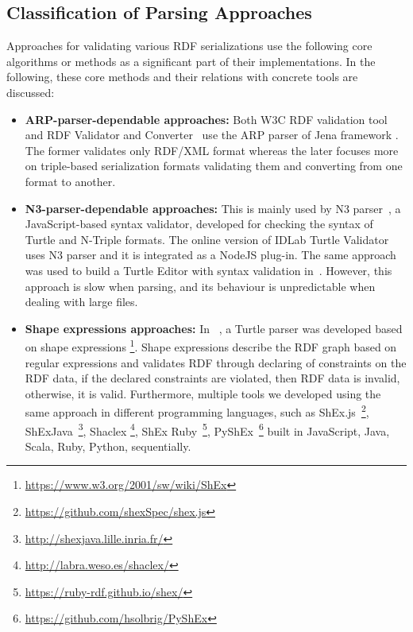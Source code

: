 \subsection{Classification of Parsing Approaches}

Approaches for validating various RDF serializations use the following core algorithms or methods as a significant part of their implementations. 
In the following, these core methods and their relations with concrete tools are discussed: 

\begin{itemize}[noitemsep] 

\item \textbf{ARP-parser-dependable approaches:} Both W3C RDF validation tool~\cite{W3C:Validation:Online} and RDF Validator and Converter~\cite{Mybluemix:Validation:Online} use the ARP parser of Jena framework \cite{McBride:2002:JSW:613357.613755}. 
The former validates only RDF/XML format whereas the later focuses more on triple-based serialization formats validating them and converting from one format to another. 

\item \textbf{N3-parser-dependable approaches:} This is mainly used by N3 parser~\cite{N3Parser:Online}, a JavaScript-based syntax validator, developed for checking the syntax of Turtle and N-Triple formats. 
The online version of IDLab Turtle Validator \cite{IDLab:Validation:Online} uses N3 parser and it is integrated as a NodeJS plug-in. 
The same approach was used to build a Turtle Editor with syntax validation in~\cite{petersenturtleeditor}. 
However, this approach is slow when parsing, and its behaviour is unpredictable when dealing with large files. 

\item \textbf{Shape expressions approaches:} In ~\cite{prud2014shape}, a Turtle parser was developed based on shape expressions \footnote{\url{https://www.w3.org/2001/sw/wiki/ShEx}}. 
Shape expressions describe the RDF graph based on regular expressions and validates RDF through declaring of constraints on the RDF data, if the declared constraints are violated, then RDF data is invalid, otherwise, it is valid. Furthermore, multiple tools we developed using the same approach in different programming languages, such as ShEx.js~\footnote{\url{https://github.com/shexSpec/shex.js}}, ShExJava~\footnote{\url{http://shexjava.lille.inria.fr/}}, Shaclex \footnote{\url{http://labra.weso.es/shaclex/}}, ShEx Ruby~\footnote{\url{https://ruby-rdf.github.io/shex/}}, PyShEx~\footnote {\url{https://github.com/hsolbrig/PyShEx}} built in JavaScript, Java, Scala, Ruby, Python, sequentially.


\end{itemize}
